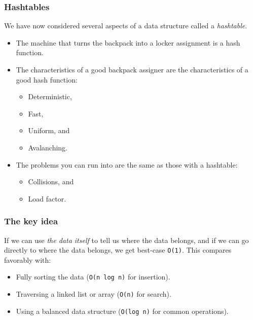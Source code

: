 \documentclass{beamer}
\begin{document}
\begin{frame}
    \frametitle{Hashtables}
    We have now considered several aspects of a data structure called a
    \emph{hashtable}.

    \vspace{1em}

    \begin{itemize}
        \item The machine that turns the backpack into a locker assignment is
              a hash function.
        \item The characteristics of a good backpack assigner are the
              characteristics of a good hash function:
              \begin{itemize}
                  \item Deterministic,
                  \item Fast,
                  \item Uniform, and
                  \item Avalanching.
              \end{itemize}
        \item The problems you can run into are the same as those with a hashtable:
              \begin{itemize}
                  \item Collisions, and
                  \item Load factor.
              \end{itemize}
    \end{itemize}
\end{frame}

\begin{frame}
    \frametitle{The key idea}

    If we can use \emph{the data itself} to tell us where the data belongs,
    and if we can go directly to where the data belongs, we get best-case
    \texttt{O(1)}. This compares favorably with:

    \vspace{1em}

    \begin{itemize}
        \item Fully sorting the data (\texttt{O(n log n)} for insertion).
        \item Traversing a linked list or array (\texttt{O(n)} for search).
        \item Using a balanced data structure (\texttt{O(log n)} for common
              operations).
    \end{itemize}
\end{frame}
\end{document}
